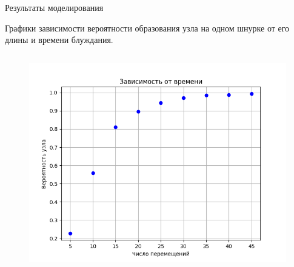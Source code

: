 \begin{frame}{Результаты моделирования}
		\begin{block}{}
			Графики зависимости вероятности образования узла на одном шнурке от его длины и времени блуждания.
		\end{block}



	\begin{columns}

		\begin{column}{0.5\linewidth}
			\begin{figure}[H]
				\includegraphics[width=1\linewidth]{img/time.png}
			\end{figure}

		\end{column}


\end{columns}
\end{frame}
